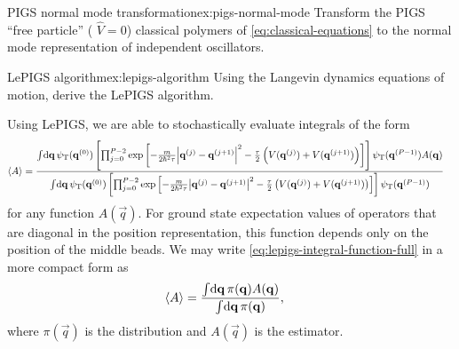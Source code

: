 \begin{DefExercise}{PIGS normal mode transformation}{ex:pigs-normal-mode}
	Transform the PIGS ``free particle'' (\ie{} $\hat{V} = 0$) classical polymers of \cref{eq:classical-equations} to the normal mode representation of independent oscillators.
\end{DefExercise}

\begin{DefExercise}{LePIGS algorithm}{ex:lepigs-algorithm}
	Using the Langevin dynamics equations of motion, derive the LePIGS algorithm.
\end{DefExercise}

Using LePIGS, we are able to stochastically evaluate integrals of the form
\begin{align}
	\mean{A}
	&= \frac{
			\int\! \dif \vec{q} \,
				\psiT(\vec{q}\bead{0})
				\left[ \prod_{j=0}^{P-2} \expb{
					-\frac{m}{2 \hbar^2 \tau} \abs{\vec{q}\bead{j} - \vec{q}\bead{j+1}}^2
					- \frac{\tau}{2} \left( V(\vec{q}\bead{j}) + V(\vec{q}\bead{j+1}) \right)
				} \right]
				\psiT(\vec{q}\bead{P-1})
				A(\vec{q})
		}{
			\int\! \dif \vec{q} \,
				\psiT(\vec{q}\bead{0})
				\left[ \prod_{j=0}^{P-2} \expb{
					-\frac{m}{2 \hbar^2 \tau} \abs{\vec{q}\bead{j} - \vec{q}\bead{j+1}}^2
					- \frac{\tau}{2} \left( V(\vec{q}\bead{j}) + V(\vec{q}\bead{j+1}) \right)
				} \right]
				\psiT(\vec{q}\bead{P-1})
		}
			\label{eq:lepigs-integral-function-full}
\end{align}
for any function $A(\vec{q})$.
For ground state expectation values of operators that are diagonal in the position representation, this function depends only on the position of the middle beads.
We may write \cref{eq:lepigs-integral-function-full} in a more compact form as
\begin{align}
	\mean{A}
	&= \frac{
			\int\! \dif \vec{q} \, \pi(\vec{q}) A(\vec{q})
		}{
			\int\! \dif \vec{q} \, \pi(\vec{q})
		},
			\label{eq:lepigs-integral-function}
\end{align}
where $\pi(\vec{q})$ is the distribution and $A(\vec{q})$ is the estimator.
